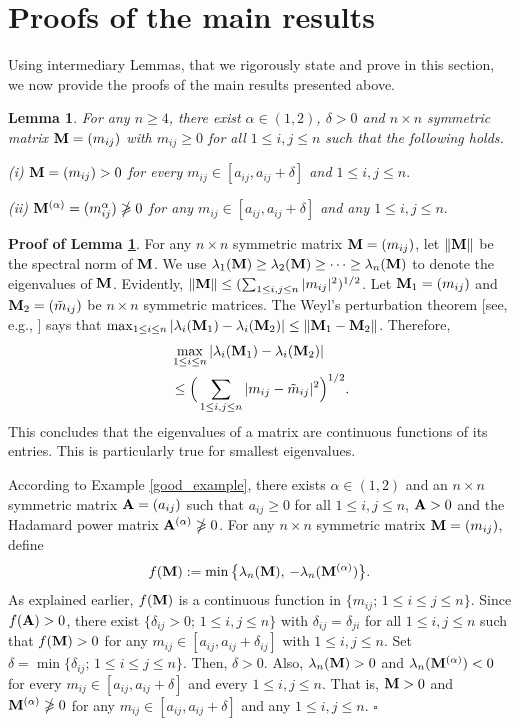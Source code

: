 \documentclass[conference,letterpaper]{IEEEtran}
\numberwithin{equation}{section}
\newcommand{\lbl}{\label}
\newcommand{\bd}{\bold}
\newcommand{\beaa}{\begin{eqnarray*}}
\newcommand{\eeaa}{\end{eqnarray*}}
\newcommand{\bea}{\begin{eqnarray}}
\newcommand{\eea}{\end{eqnarray}}
\newtheorem{lemma}{{\sc Lemma}}[section]
\begin{document}
\section{Proofs of the main results}\lbl{sec:proofs}
Using intermediary Lemmas, that we rigorously state and prove in this section, we now provide the proofs of the main results presented above.

\begin{lemma}\lbl{what_is} For any $n\geq 4$, there exist $\alpha\in (1,2)$, $\delta>0$ and $n\times n$ symmetric matrix  $\bd{M}=(m_{ij})$ with $m_{ij}\geq 0$ for all $1\leq i, j \leq n$ such that the following holds.

(i) $\bd{M}=(m_{ij})>0$  for every $m_{ij}\in [a_{ij}, a_{ij}+\delta]$ and $1\leq i, j \leq n.$

(ii) $\bd{M}^{(\alpha)}=(m_{ij}^{\alpha})\ngeqslant 0$  for any $m_{ij}\in [a_{ij}, a_{ij}+\delta]$ and any $1\leq i, j \leq n.$
\end{lemma}
\noindent\textbf{Proof of Lemma \ref{what_is}}. For any $n\times n$ symmetric matrix $\bd{M}=(m_{ij})$, let  $\|\bd{M}\|$ be the spectral norm of $\bd{M}$. We use $\lambda_1(\bd{M})\geq \lambda_2(\bd{M})\geq \cdots \geq \lambda_n(\bd{M})$ to denote  the eigenvalues of $\bd{M}$.  Evidently, $\|\bd{M}\|\leq (\sum_{1\leq i, j \leq n}|m_{ij}|^2)^{1/2}$. Let $\bd{M}_1=(m_{ij})$ and $\bd{M}_2=(\tilde{m}_{ij})$ be $n\times n$ symmetric matrices. The Weyl's perturbation theorem [see, e.g., \cite{horn1985}] says that
$\max_{1\leq i \leq n}|\lambda_i(\bd{M}_1)-\lambda_i(\bd{M}_2)|\leq \|\bd{M}_1-\bd{M}_2\|$.  Therefore,
\bea
& \max_{1\leq i \leq n}|\lambda_i(\bd{M}_1)-\lambda_i(\bd{M}_2)|\\\notag
&\leq \Big(\sum_{1\leq i, j \leq n}|m_{ij}-\tilde{m}_{ij}|^2\Big)^{1/2}.\lbl{flower_could}
\eea
This concludes that the eigenvalues of a matrix are continuous functions of its entries. This is particularly true for smallest eigenvalues.

According to Example \ref{good_example}, there exists  $\alpha\in (1, 2)$ and an $n\times n$ symmetric matrix $\bd{A}=(a_{ij})$ such that $a_{ij}\geq 0$ for all $1\leq i, j \leq n$, $\bd{A}>0$ and the Hadamard power matrix $\bd{A}^{(\alpha)} \ngeqslant 0$. For any $n\times n$ symmetric matrix  $\bd{M}=(m_{ij})$, define
\beaa
f(\bd{M}):=\min\big\{\lambda_n(\bd{M}),\, -\lambda_n(\bd{M}^{(\alpha)})\big\}.
\eeaa
As explained earlier, $f(\bd{M})$ is a continuous function in $\{m_{ij};\, 1\leq i\leq j \leq n\}$. Since $f(\bd{A})>0$, there exist $\{\delta_{ij}>0;\, 1\leq i, j\leq n\}$ with $\delta_{ij}=\delta_{ji}$ for all $1\leq i, j\leq n$ such that $f(\bd{M})>0$ for any  $m_{ij}\in [a_{ij}, a_{ij}+\delta_{ij}]$ with $1\leq i, j\leq n.$ Set $\delta= \min\{\delta_{ij};\, 1\leq i\leq j\leq n\}.$ Then, $\delta>0$. Also, $\lambda_n(\bd{M})>0$ and $\lambda_n(\bd{M}^{(\alpha)})<0$ for every $m_{ij}\in [a_{ij}, a_{ij}+\delta]$ and every $1\leq i, j\leq n.$ That is, $\bd{M}>0$  and $\bd{M}^{(\alpha)} \ngeqslant 0$  for any $m_{ij}\in [a_{ij}, a_{ij}+\delta]$ and any $1\leq i, j\leq n.$
\hfill$\square$
\end{document}
